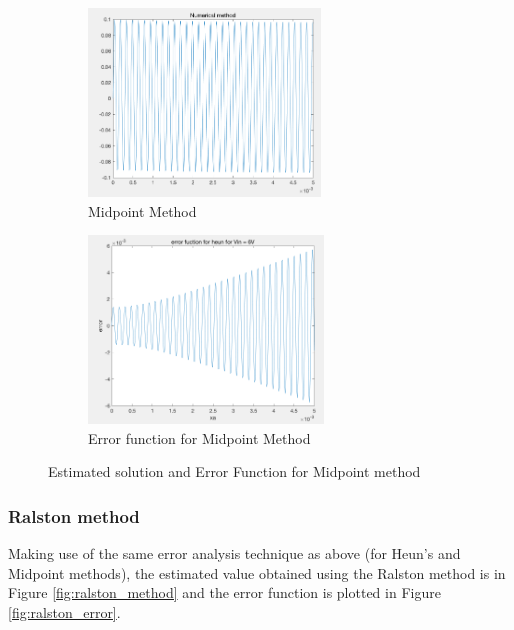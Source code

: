 \documentclass[11pt,a4paper]{article}
\begin{document}
\begin{figure}[h]
\begin{subfigure}{.5\textwidth}
  \includegraphics[width=.9\linewidth,height = 5cm
  ]{Ex2_Figs/midpoint_error_numerical_method}
  \caption[right]{Midpoint Method}
  \label{fig:midpoint_method}
\end{subfigure}
\begin{subfigure}{.5\textwidth}
  \includegraphics[width=.9\linewidth,height = 5cm]{Ex2_Figs/heun_error}
  \caption{Error function for Midpoint Method}
  \label{fig:midpoint_error}
\end{subfigure}
\caption{Estimated solution and Error Function for Midpoint method}
\label{fig:Method_Error_sub}
\end{figure}




\subsubsection{Ralston method}
Making use of the same error analysis technique as above (for Heun's and Midpoint methods), the estimated value obtained using the Ralston method is in Figure \ref{fig:ralston_method} and the error function is plotted in Figure \ref{fig:ralston_error}.
\end{document}

